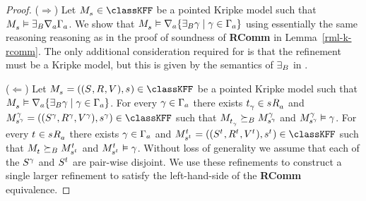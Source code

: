 \begin{proof}
($\Rightarrow$) Let $\kPModel{\kStateS} \in \classKFF$ be a pointed Kripke model such that $\kPModel{\kStateS} \entails \somerefsBs \coversA \Gamma_\agentA$.
We show that $\kPModel{\kStateS} \entails \coversA \{\somerefsBs \gamma \mid \gamma \in \Gamma_\agentA\}$ using essentially the same reasoning reasoning as in the proof of soundness of {\bf RComm} in Lemma~\ref{rml-k-rcomm}.
The only additional consideration required for \logicRmlKFF{} is that the refinement must be a \classKFF{} Kripke model, but this is given by the semantics of $\somerefsBs$ in \logicRmlKFF{}.

($\Leftarrow$) Let $\kPModelAndTuple{\kStateS} \in \classKFF$ be a pointed Kripke model such that $\kPModel{\kStateS} \entails \coversA \{\somerefsBs \gamma \mid \gamma \in \Gamma_\agentA\}$.
For every $\gamma \in \Gamma_\agentA$ there exists $\kStateT_\gamma \in \kSuccessorsA{\kStateS}$ and $\kPModelAndTuple[\gamma]{\kStateS[\gamma]} \in \classKFF$ such that $\kPModel{\kStateT_\gamma} \simulatesBs \kPModel[\gamma]{\kStateS[\gamma]}$ and $\kPModel[\gamma]{\kStateS[\gamma]} \entails \gamma$.
For every $\kStateT \in \kSuccessorsA{\kStateS}$ there exists $\gamma \in \Gamma_\agentA$ and $\kPModelAndTuple[\kStateT]{\kStateS[\kStateT]} \in \classKFF$ such that $\kPModel{\kStateT} \simulatesBs \kPModel[\kStateT]{\kStateS[\kStateT]}$ and $\kPModel[\kStateT]{\kStateS[\kStateT]} \entails \gamma$.
Without loss of generality we assume that each of the $\kStates[\gamma]$ and $\kStates[\kStateT]$ are pair-wise disjoint.
We use these refinements to construct a single larger refinement to satisfy the left-hand-side of the {\bf RComm} equivalence.


\end{proof}
